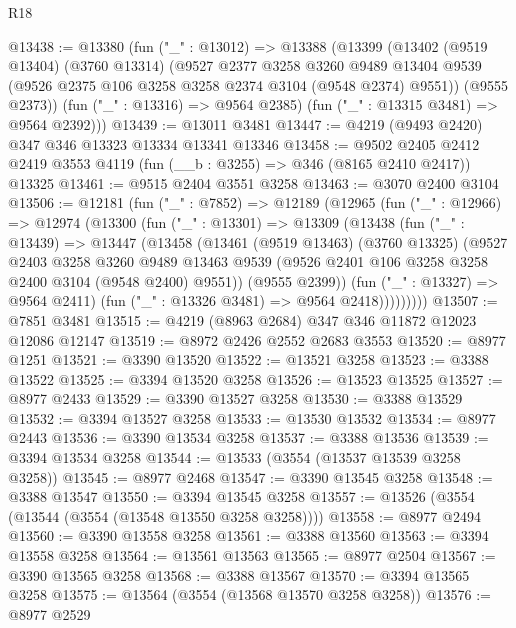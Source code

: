 \begin{lexlean}{R18}
\begin{coremodule}
@13438 := @13380
    (fun ("_" : @13012) =>
    @13388
      (@13399
        (@13402
          (@9519 @13404)
          (@3760 @13314)
          (@9527
            @2377
            @3258
            @3260
            @9489
            @13404
            @9539
            (@9526 @2375 @106 @3258 @3258 @2374 @3104 (@9548 @2374) @9551))
          (@9555 @2373))
        (fun ("_" : @13316) => @9564 @2385)
        (fun ("_" : @13315 @3481) => @9564 @2392)))
@13439 := @13011 @3481
@13447 := @4219 (@9493 @2420) @347 @346 @13323 @13334 @13341 @13346
@13458 := @9502 @2405 @2412 @2419 @3553 @4119 (fun (__b : @3255) => @346 (@8165 @2410 @2417)) @13325
@13461 := @9515 @2404 @3551 @3258
@13463 := @3070 @2400 @3104
@13506 := @12181
    (fun ("_" : @7852) =>
    @12189
      (@12965
        (fun ("_" : @12966) =>
        @12974
          (@13300
            (fun ("_" : @13301) =>
            @13309
              (@13438
                (fun ("_" : @13439) =>
                @13447
                  (@13458
                    (@13461
                      (@9519 @13463)
                      (@3760 @13325)
                      (@9527
                        @2403
                        @3258
                        @3260
                        @9489
                        @13463
                        @9539
                        (@9526 @2401 @106 @3258 @3258 @2400 @3104 (@9548 @2400) @9551))
                      (@9555 @2399))
                    (fun ("_" : @13327) => @9564 @2411)
                    (fun ("_" : @13326 @3481) => @9564 @2418)))))))))
@13507 := @7851 @3481
@13515 := @4219 (@8963 @2684) @347 @346 @11872 @12023 @12086 @12147
@13519 := @8972 @2426 @2552 @2683 @3553
@13520 := @8977 @1251
@13521 := @3390 @13520
@13522 := @13521 @3258
@13523 := @3388 @13522
@13525 := @3394 @13520 @3258
@13526 := @13523 @13525
@13527 := @8977 @2433
@13529 := @3390 @13527 @3258
@13530 := @3388 @13529
@13532 := @3394 @13527 @3258
@13533 := @13530 @13532
@13534 := @8977 @2443
@13536 := @3390 @13534 @3258
@13537 := @3388 @13536
@13539 := @3394 @13534 @3258
@13544 := @13533 (@3554 (@13537 @13539 @3258 @3258))
@13545 := @8977 @2468
@13547 := @3390 @13545 @3258
@13548 := @3388 @13547
@13550 := @3394 @13545 @3258
@13557 := @13526 (@3554 (@13544 (@3554 (@13548 @13550 @3258 @3258))))
@13558 := @8977 @2494
@13560 := @3390 @13558 @3258
@13561 := @3388 @13560
@13563 := @3394 @13558 @3258
@13564 := @13561 @13563
@13565 := @8977 @2504
@13567 := @3390 @13565 @3258
@13568 := @3388 @13567
@13570 := @3394 @13565 @3258
@13575 := @13564 (@3554 (@13568 @13570 @3258 @3258))
@13576 := @8977 @2529

\end{coremodule}
\end{lexlean}
